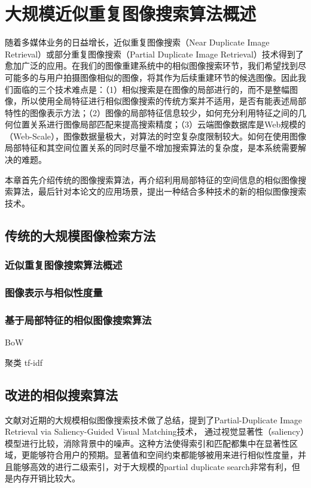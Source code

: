 

\chapter{大规模近似重复图像搜索算法概述}

随着多媒体业务的日益增长，近似重复图像搜索（Near Duplicate Image Retrieval）或部分重复图像搜索（Partial Duplicate Image Retrieval）技术得到了愈加广泛的应用。在我们的图像重建系统中的相似图像搜索环节，我们希望找到尽可能多的与用户拍摄图像相似的图像，将其作为后续重建环节的候选图像。因此我们面临的三个技术难点是：（1）相似搜索是在图像的局部进行的，而不是整幅图像，所以使用全局特征进行相似图像搜索的传统方案并不适用，是否有能表述局部特性的图像表示方法；（2）图像的局部特征信息较少，如何充分利用特征之间的几何位置关系进行图像局部匹配来提高搜索精度；（3）云端图像数据库是Web规模的（Web-Scale），图像数据量极大，对算法的时空复杂度限制较大。如何在使用图像局部特征和其空间位置关系的同时尽量不增加搜索算法的复杂度，是本系统需要解决的难题。

本章首先介绍传统的图像搜索算法，再介绍利用局部特征的空间信息的相似图像搜索算法，最后针对本论文的应用场景，提出一种结合多种技术的新的相似图像搜索技术。

\section{传统的大规模图像检索方法}

\subsection{近似重复图像搜索算法概述}

\subsection{图像表示与相似性度量}

\subsection{基于局部特征的相似图像搜索算法}
BoW

聚类
tf-idf


\section{改进的相似搜索算法}
文献\cite{POLICY:2013te}对近期的大规模相似图像搜索技术做了总结，提到了Partial-Duplicate Image Retrieval via Saliency-Guided Visual Matching\cite{Li:2013ks}技术，
通过视觉显著性（saliency）模型进行比较，消除背景中的噪声。这种方法使得索引和匹配都集中在显著性区域，更能够符合用户的预期。显著值和空间约束都能够被用来进行相似性度量，并且能够高效的进行二级索引，对于大规模的partial duplicate search非常有利，但是内存开销比较大。

